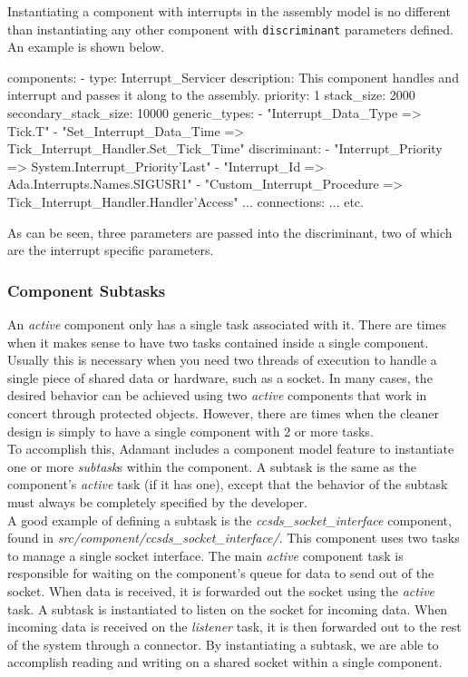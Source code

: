 Instantiating a component with interrupts in the assembly model is no different than instantiating any other component with \texttt{discriminant} parameters defined. An example is shown below.

\vspace{5mm} %
\begin{yamlcode}
components:
  - type: Interrupt_Servicer
    description: This component handles and interrupt and passes it along to the assembly.
    priority: 1
    stack_size: 2000
    secondary_stack_size: 10000
    generic_types:
      - "Interrupt_Data_Type => Tick.T"
      - "Set_Interrupt_Data_Time => Tick_Interrupt_Handler.Set_Tick_Time"
    discriminant:
      - "Interrupt_Priority => System.Interrupt_Priority'Last"
      - "Interrupt_Id => Ada.Interrupts.Names.SIGUSR1"
      - "Custom_Interrupt_Procedure => Tick_Interrupt_Handler.Handler'Access"
  ... 
connections: 
  ...
  etc.
\end{yamlcode}
\vspace{5mm} %

As can be seen, three parameters are passed into the discriminant, two of which are the interrupt specific parameters.

\subsubsection{Component Subtasks}
 
An \textit{active} component only has a single task associated with it. There are times when it makes sense to have two tasks contained inside a single component. Usually this is necessary when you need two threads of execution to handle a single piece of shared data or hardware, such as a socket. In many cases, the desired behavior can be achieved using two \textit{active} components that work in concert through protected objects. However, there are times when the cleaner design is simply to have a single component with 2 or more tasks. \\

To accomplish this, Adamant includes a component model feature to instantiate one or more \textit{subtask}s within the component. A subtask is the same as the component's \textit{active} task (if it has one), except that the behavior of the subtask must always be completely specified by the developer. \\

A good example of defining a subtask is the \textit{ccsds\_socket\_interface} component, found in \textit{src/component/ccsds\_socket\_interface/}. This component uses two tasks to manage a single socket interface. The main \textit{active} component task is responsible for waiting on the component's queue for data to send out of the socket. When data is received, it is forwarded out the socket using the \textit{active} task. A subtask is instantiated to listen on the socket for incoming data. When incoming data is received on the \textit{listener} task, it is then forwarded out to the rest of the system through a connector. By instantiating a subtask, we are able to accomplish reading and writing on a shared socket within a single component. \\

